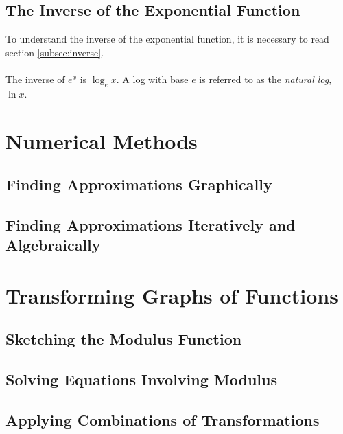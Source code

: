 \documentclass{article}
\begin{document}
	\subsection{The Inverse of the Exponential Function}
	To understand the inverse of the exponential function, it is necessary to read section \ref{subsec:inverse}.
	\\\\
	The inverse of $e^x$ is $\log_ex$. A log with base $e$ is referred to as the \textit{natural log}, $\ln x$. 
	
	\begin{center}
	\end{center}
	\section{Numerical Methods}
	\subsection{Finding Approximations Graphically }
	\subsection{Finding Approximations Iteratively and Algebraically}
	\section{Transforming Graphs of Functions}
	\subsection{Sketching the Modulus Function}
	\subsection{Solving Equations Involving Modulus}
	\subsection{Applying Combinations of Transformations}
	\newpage
\end{document}
